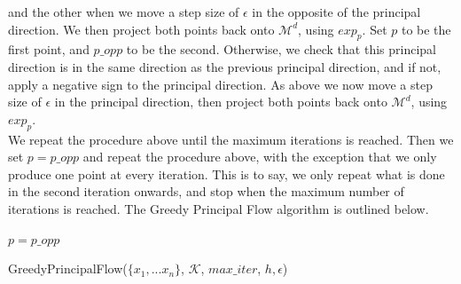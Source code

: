 \documentclass[12pt]{report}
\begin{document}
and the other when we move a step size of $\epsilon$ in the 
opposite of the principal direction. We then project both points back onto 
$\mathcal{M}^d$, using $exp_p$. 
Set $p$ to be the first point, and $p\_opp$ to be the second. 
Otherwise, we check that this principal direction is in the same 
direction as the previous principal direction, and if not, apply a negative sign
to the principal direction. 
As above we now move a step size of $\epsilon$ in the principal direction, 
then project both points back onto 
$\mathcal{M}^d$, using $exp_p$.\\
We repeat the procedure above until the maximum iterations is reached.
Then we set $p = p\_opp$ and repeat the procedure above, with the 
exception that we only produce one point at every iteration. This is to say, 
we only repeat what is done in the second iteration onwards, and stop when the 
maximum number of iterations is reached. 
The Greedy Principal Flow algorithm is outlined below.

\begin{algorithm}
    $p = p\_opp$\;
    \caption{GreedyPrincipalFlow($\{x_1,...x_n\}$, $\mathcal{K}$, $max\_iter$, $h, \epsilon$)}
\end{algorithm}
\end{document}
